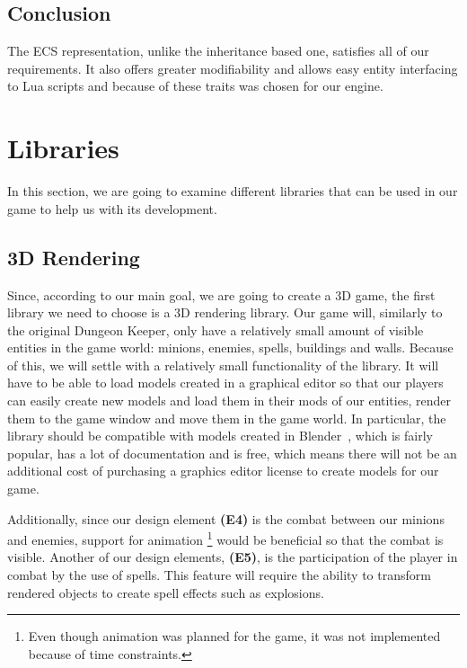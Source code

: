 \subsection{Conclusion}

The ECS representation, unlike the inheritance based one,  satisfies all of our requirements. It also offers greater modifiability and
allows easy entity interfacing to Lua scripts and because of these traits was chosen for our engine.

\section{Libraries}

In this section, we are going to examine different libraries that can be used in our game
to help us with its development.

\subsection{3D Rendering}

Since, according to our main goal, we are going to create a 3D game, the first library we need to choose is a 3D rendering library.
Our game will, similarly to the original Dungeon Keeper, only have a relatively small amount of visible entities in the game world: 
minions, enemies, spells, buildings and walls. Because of this, we will settle with a relatively small functionality of the library.
It will have to be able to load models created in a graphical editor so that our players can easily create new models and load them
in their mods  of our entities, render them to the game window and move them in the game world. In particular, the library should be
compatible with models created in Blender~\cite{Blender}, which is fairly popular, has a lot of documentation and is free, which means
there will not be an additional cost of purchasing a graphics editor license to create models for our game.

Additionally, since our design element \textbf{(E4)} is the combat between our minions and enemies, support for animation
\footnote{Even though animation was planned for the game, it was not implemented because of time constraints.} would be
beneficial so that the combat is visible. Another of our design elements, \textbf{(E5)}, is the participation of the player in combat
by the use of spells. This feature will require the ability to transform rendered objects to create spell effects such as explosions.

